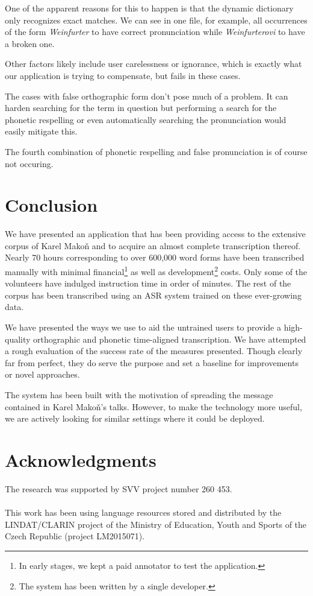 \documentclass{itatnew}
\begin{document}
One of the apparent reasons for this to happen is that the dynamic dictionary
only recognizes exact matches. We can see in one file, for example, all
occurrences of the form {\em Weinfurter} to have correct pronunciation while
{\em Weinfurterovi} to have a broken one.

Other factors likely include user carelessness or ignorance, which is
exactly what our application is trying to compensate, but fails in these cases.

The cases with false orthographic form don't pose much of a problem. It can
harden searching for the term in question but performing a search for the
phonetic respelling or even automatically searching the pronunciation would
easily mitigate this.

The fourth combination of phonetic respelling and false pronunciation is of
course not occuring.

\section{Conclusion}

We have presented an application that has been providing access to the
extensive corpus of Karel Makoň and to acquire an almost complete transcription
thereof. Nearly 70 hours corresponding to over 600,000 word forms have been
transcribed manually with minimal financial\footnote{In early stages, we kept a paid
annotator to test the application.} as well as development\footnote{The system
has been written by a single developer.} costs. Only some of the volunteers have
indulged instruction time in order of minutes. The rest of the corpus has been
transcribed using an ASR system trained on these ever-growing data.

We have presented the ways we use to aid the untrained users to provide a
high-quality orthographic and phonetic time-aligned transcription. We have
attempted a rough evaluation of the success rate of the measures presented.
Though clearly far from perfect, they do serve the purpose and set a baseline
for improvements or novel approaches.

The system has been built with the motivation of spreading the message contained
in Karel Makoň's talks. However, to make the technology more useful, we are
actively looking for similar settings where it could be deployed.

\section*{Acknowledgments}

The research was supported by SVV project number 260 453.\\
\\
This work has been using language resources stored
and distributed  by the LINDAT/CLARIN project of the Ministry of Education,
Youth and Sports of the Czech Republic (project LM2015071).



\end{document}
